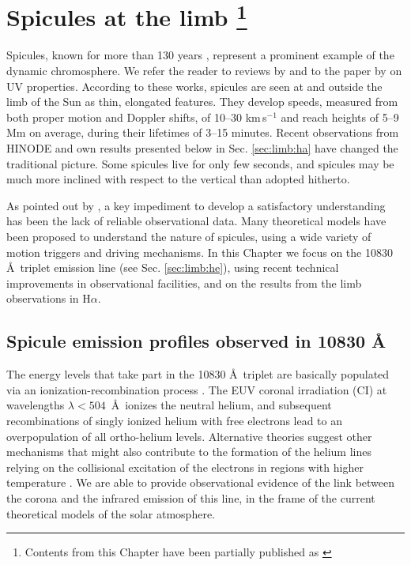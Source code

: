 \chapter[Spicules at the limb]{Spicules at the limb \label{ch:spicules}\Large{\protect\footnote{Contents from this Chapter have been partially published as \cite{2007A&A...472L..51S}}}}

Spicules, known for more than 130 years \citep[see the hand drawings by][]{secchi1877}, represent a prominent example of the dynamic
chromosphere. We refer the reader to reviews by \citet{beckers68,beckers72} and to the paper by \citet{wilhelm00} on UV properties. According to these works, spicules are seen at and outside the limb of the Sun as thin, elongated features. They develop speeds, measured from both proper motion and Doppler shifts, of 10--30 km\,s$^{-1}$ and reach
heights of 5--9 Mm on average, during their lifetimes of 3--15 minutes. Recent observations from HINODE \citep{2007SoPh..243....3K} and own results presented below in Sec. \ref{sec:limb:ha} have changed the traditional picture. Some spicules live for only few seconds, and spicules may be much more inclined with respect to the vertical than adopted hitherto.  

As pointed out by \citet{sterling00}, a key impediment to develop a satisfactory understanding has been the lack of reliable observational data. 
Many theoretical models have been proposed to understand the nature of spicules, using a wide variety of motion triggers and driving mechanisms. 
In this Chapter we focus on the  10830\,\AA\ triplet emission line (see Sec. \ref{sec:limb:he}), using recent technical improvements in observational facilities, and on the results from the limb observations in H$\alpha$.

\section{Spicule emission profiles observed in  10830 \AA\label{spicules}}

The energy levels that take part in the    10830 \AA\, triplet are basically populated via
an ionization-recombination process \citep{1994isp..book...35A}. The EUV coronal irradiation (CI) at 
wavelengths $\lambda<504$~\AA\ ionizes the neutral helium, and subsequent recombinations of singly ionized helium with free electrons lead to an overpopulation of all ortho-helium levels. Alternative theories suggest other mechanisms that might also contribute to the formation of the helium lines relying on the collisional excitation of the electrons in regions with higher temperature \citep[e.g.,][]{1997ApJ...489..375A}.  We are able to provide observational evidence of the link between the corona and the infrared emission of this line, in the frame of the current theoretical models of the solar atmosphere.
 
